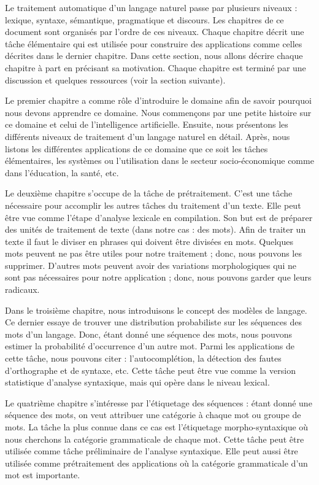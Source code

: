\documentclass{KodeBook}
\begin{document}
Le traitement automatique d'un langage naturel passe par plusieurs niveaux : lexique, syntaxe, sémantique, pragmatique et discours. 
Les chapitres de ce document sont organisés par l'ordre de ces niveaux.
Chaque chapitre décrit une tâche élémentaire qui est utilisée pour construire des applications comme celles décrites dans le dernier chapitre.
Dans cette section, nous allons décrire chaque chapitre à part en précisant sa motivation.
Chaque chapitre est terminé par une discussion et quelques ressources (voir la section suivante).


Le premier chapitre a comme rôle d'introduire le domaine afin de savoir pourquoi nous devons apprendre ce domaine.
Nous commençons par une petite histoire sur ce domaine et celui de l'intelligence artificielle.
Ensuite, nous présentons les différents niveaux de traitement d'un langage naturel en détail.
Après, nous listons les différentes applications de ce domaine que ce soit les tâches élémentaires, les systèmes ou l'utilisation dans le secteur socio-économique comme dans l'éducation, la santé, etc. 


Le deuxième chapitre s'occupe de la tâche de prétraitement.
C'est une tâche nécessaire pour accomplir les autres tâches du traitement d'un texte.
Elle peut être vue comme l'étape d'analyse lexicale en compilation.
Son but est de préparer des unités de traitement de texte (dans notre cas : des mots).
Afin de traiter un texte il faut le diviser en phrases qui doivent être divisées en mots.
Quelques mots peuvent ne pas être utiles pour notre traitement ; donc, nous pouvons les supprimer.
D'autres mots peuvent avoir des variations morphologiques qui ne sont pas nécessaires pour notre application ; donc, nous pouvons garder que leurs radicaux.


Dans le troisième chapitre, nous introduisons le concept des modèles de langage.
Ce dernier essaye de trouver une distribution probabiliste sur les séquences des mots d'un langage.
Donc, étant donné une séquence des mots, nous pouvons estimer la probabilité d'occurrence d'un autre mot.
Parmi les applications de cette tâche, nous pouvons citer : l'autocomplétion, la détection des fautes d'orthographe et de syntaxe, etc.
Cette tâche peut être vue comme la version statistique d'analyse syntaxique, mais qui opère dans le niveau lexical.


Le quatrième chapitre s'intéresse par l'étiquetage des séquences : étant donné une séquence des mots, on veut attribuer une catégorie à chaque mot ou groupe de mots.
La tâche la plus connue dans ce cas est l'étiquetage morpho-syntaxique où nous cherchons la catégorie grammaticale de chaque mot.
Cette tâche peut être utilisée comme tâche préliminaire de l'analyse syntaxique.
Elle peut aussi être utilisée comme prétraitement des applications où la catégorie grammaticale d'un mot est importante.
\end{document}
